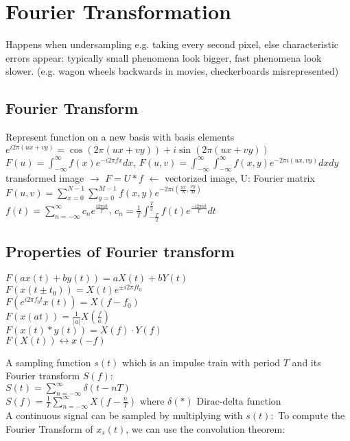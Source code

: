 

\section{Fourier Transformation}
 Happens when undersampling e.g. taking every second pixel, else characteristic errors appear: typically small phenomena look bigger, fast phenomena look slower. (e.g. wagon wheels backwards in movies, checkerboards misrepresented)
\subsection*{Fourier Transform}
Represent function on a new basis with basis elements $e^{i 2 \pi (ux + vy)} = \cos(2 \pi (ux + vy)) + i \sin(2 \pi (ux + vy))$\\
$F(u) = \int_{-\infty}^{\infty} f(x) e^{-i 2 \pi fx} dx$,  $F(u, v) = \int_{-\infty}^{\infty} \int_{-\infty}^{\infty} f(x, y) e^{-2\pi i (ux, vy)}dx dy$\\
 transformed image $\rightarrow$ $F = U * f$ $\leftarrow$ vectorized image, U: Fourier matrix\\
 $F(u, v) = \sum_{x=0}^{N-1} \sum_{y=0}^{M-1} f(x, y) e^{-2\pi i (\frac{ux}{N}, \frac{vy}{M})}$\\
 $f(t) = \sum_{n = -\infty}^{\infty} c_n e^{\frac{i 2 \pi n t}{T}}$, $c_n = \frac{1}{T} \int_{-\frac{T}{2}}^{\frac{T}{2}} f(t) e^{\frac{-i 2 \pi n t}{T}} dt$
\subsection*{Properties of Fourier transform}
 $F(ax(t) + by(t)) = aX(t) + bY(t)$\\
 $F(x(t \pm t_0)) = X(t) e^{\pm i 2 \pi f t_0}$\\
 $F(e^{i 2 \pi f_0 t} x(t)) = X(f - f_0)$\\
 $F(x(at)) = \frac{1}{|a|}X\left(\frac{f}{a}\right)$\\
 $F(x(t) * y(t)) = X(f) \cdot Y(f)$\\
 $F(X(t)) \longleftrightarrow x(-f)$

\color{definitionColor}
 \color{black}

A sampling function $s(t)$ which is an impulse train with period $T$ and its Fourier transform $S(f)$:\\
\color{gray}
$S(t) = \sum_{n = -\infty}^\infty \delta\left(t - nT\right)$\\
$ S(f) = \frac{1}{T} \sum_{n = -\infty}^\infty X(f - \frac{n}{T}) \text{ where } \delta(*) \text{  Dirac-delta function}$\\
\color{black}
A continuous signal can be sampled by multiplying with $s(t):$ To compute the Fourier Transform of $x_s(t)$, we can use the convolution theorem:


